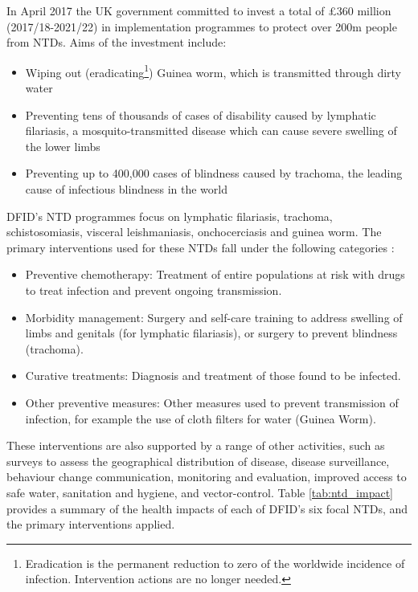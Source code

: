 In April 2017 the UK government committed to invest a total of \pounds 360 million (2017/18-2021/22) in implementation programmes to protect over 200m people from NTDs. %
Aims of the investment include:
\begin{itemize}
\item Wiping out (eradicating\footnote{Eradication is the permanent reduction to zero of the worldwide incidence of infection. Intervention actions are no longer needed.}) Guinea worm, which is transmitted through dirty water
\item Preventing tens of thousands of cases of disability caused by lymphatic filariasis, a mosquito-transmitted disease which can cause severe swelling of the lower limbs
\item Preventing up to 400,000 cases of blindness caused by trachoma, the leading cause of infectious blindness in the world
\end{itemize}

DFID's NTD programmes focus on lymphatic filariasis, trachoma, schistosomiasis, visceral leishmaniasis, onchocerciasis and guinea worm. %
The primary interventions used for these NTDs fall under the following categories :
\begin{itemize}
\item Preventive chemotherapy: Treatment of entire populations at risk with drugs to treat infection and prevent ongoing transmission.
\item Morbidity management: Surgery and self-care training to address swelling of limbs and genitals (for lymphatic filariasis), or surgery to prevent blindness (trachoma).
\item Curative treatments: Diagnosis and treatment of those found to be infected.
\item Other preventive measures: Other measures used to prevent transmission of infection, for example the use of cloth filters for water (Guinea Worm).
\end{itemize}

These interventions are also supported by a range of other activities, such as surveys to assess the geographical distribution of disease, disease surveillance, behaviour change communication, monitoring and evaluation, improved access to safe water, sanitation and hygiene, and vector-control. %
Table \ref{tab:ntd_impact} provides a summary of the health impacts of each of DFID's six focal NTDs, and the primary interventions applied. %


